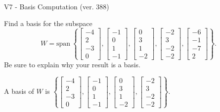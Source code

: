 \begin{exercise}
  \begin{exerciseTitle}V7 - Basis Computation (ver. 388)\end{exerciseTitle}
  \begin{exerciseStatement}
    Find a basis for the subspace 
\[W=\mathrm{span}\ \left\{\left[\begin{array}{r}
-4 \\
2 \\
-3 \\
0
\end{array}\right] , \left[\begin{array}{r}
-1 \\
0 \\
1 \\
-1
\end{array}\right] , \left[\begin{array}{r}
0 \\
3 \\
1 \\
-2
\end{array}\right] , \left[\begin{array}{r}
-2 \\
3 \\
-2 \\
-2
\end{array}\right] , \left[\begin{array}{r}
-6 \\
-1 \\
-7 \\
2
\end{array}\right]\right\}.\]
 Be sure to explain why your result is a basis.


  \end{exerciseStatement}
  \begin{exerciseAnswer}
   A basis of \(W\) is  \(\left\{\left[\begin{array}{r}
-4 \\
2 \\
-3 \\
0
\end{array}\right] , \left[\begin{array}{r}
-1 \\
0 \\
1 \\
-1
\end{array}\right] , \left[\begin{array}{r}
0 \\
3 \\
1 \\
-2
\end{array}\right] , \left[\begin{array}{r}
-2 \\
3 \\
-2 \\
-2
\end{array}\right]\right\}\).
  


  \end{exerciseAnswer}
\end{exercise}